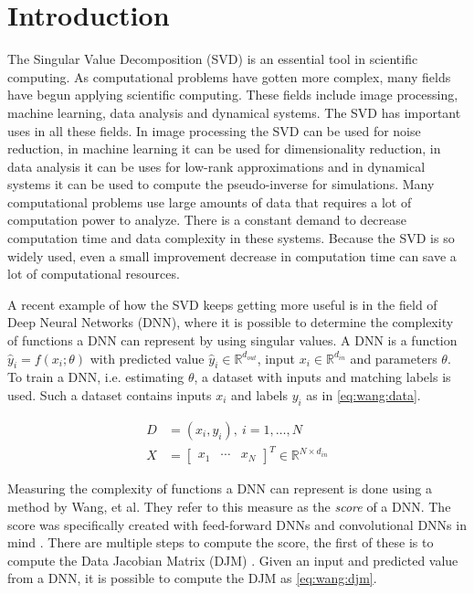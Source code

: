 \chapter {Introduction}

The Singular Value Decomposition (SVD) is an essential tool in scientific computing. As computational problems have gotten more complex, many fields have begun applying scientific computing. These fields include image processing, machine learning, data analysis and dynamical systems. The SVD has important uses in all these fields. In image processing the SVD can be used for noise reduction, in machine learning it can be used for dimensionality reduction, in data analysis it can be uses for low-rank approximations and in dynamical systems it can be used to compute the pseudo-inverse for simulations. Many computational problems use large amounts of data that requires a lot of computation power to analyze. There is a constant demand to decrease computation time and data complexity in these systems. Because the SVD is so widely used, even a small improvement decrease in computation time can save a lot of computational resources.

A recent example of how the SVD keeps getting more useful is in the field of Deep Neural Networks (DNN), where it is possible to determine the complexity of functions a DNN can represent by using singular values. A DNN is a function $\hat y_i = f(x_i; \theta)$ with predicted value $\hat y_i \in \mathbb{R}^{d_{out}}$, input $x_i \in \mathbb{R}^{d_{in}}$ and parameters $\theta$. To train a DNN, i.e. estimating $\theta$, a dataset with inputs and matching labels is used. Such a dataset contains inputs $x_i$ and labels $y_i$ as in \eqref{eq:wang:data}.

\begin{equation} \label{eq:wang:data}
  \begin{split}
    D &= {(x_i,y_i)},\ i=1,\dotsc,N \\
    X &=
    \begin{bmatrix}
      x_1 & \cdots & x_N
    \end{bmatrix}^T \in \mathbb{R}^{N \times d_{in}}
  \end{split}
\end{equation}

Measuring the complexity of functions a DNN can represent is done using a method by Wang, et al. They refer to this measure as the \textit{score} of a DNN. The score was specifically created with feed-forward DNNs and convolutional DNNs in mind \cite{icml16:wang:edjm}. There are multiple steps to compute the score, the first of these is to compute the Data Jacobian Matrix (DJM) \cite{icml16:wang:edjm}. Given an input and predicted value from a DNN, it is possible to compute the DJM as \eqref{eq:wang:djm}.

